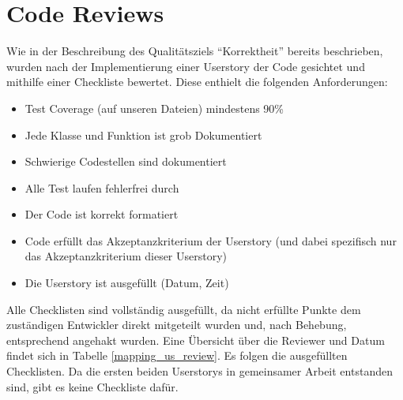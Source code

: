 \section{Code Reviews}
Wie in der Beschreibung des Qualitätsziels "`Korrektheit"' bereits beschrieben, wurden nach der Implementierung einer Userstory
der Code gesichtet und mithilfe einer Checkliste bewertet. Diese enthielt die folgenden Anforderungen:
\begin{itemize}
	\item Test Coverage (auf unseren Dateien) mindestens 90\%
	\item Jede Klasse und Funktion ist grob Dokumentiert
	\item Schwierige Codestellen sind dokumentiert
	\item Alle Test laufen fehlerfrei durch
	\item Der Code ist korrekt formatiert
	\item Code erfüllt das Akzeptanzkriterium der Userstory (und dabei spezifisch nur das Akzeptanzkriterium dieser Userstory)
	\item Die Userstory ist ausgefüllt (Datum, Zeit)
\end{itemize}
Alle Checklisten sind vollständig ausgefüllt, da nicht erfüllte Punkte dem zuständigen Entwickler direkt mitgeteilt wurden und, nach Behebung, entsprechend
angehakt wurden. Eine Übersicht über die Reviewer und Datum findet sich in Tabelle \ref{mapping_us_review}.
Es folgen die ausgefüllten Checklisten. Da die ersten beiden Userstorys in gemeinsamer Arbeit entstanden sind, gibt es keine Checkliste dafür.

